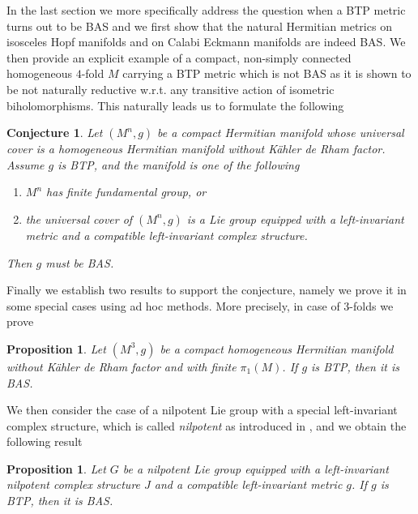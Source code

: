 \documentclass{amsart}
\numberwithin{equation}{section}
\newtheorem{proposition}[theorem]{Proposition}
\newtheorem{conjecture}  [theorem]     {Conjecture}
\theoremstyle{definition}
\renewcommand{\1}{\mathds{1}}
\renewcommand{\>}{\rightarrow}
\begin{document}
In the last section we more specifically address the question when a {\rm BTP} metric turns out to be {\rm BAS} and we first show that the natural Hermitian metrics on isosceles Hopf manifolds and on Calabi Eckmann manifolds are indeed {\rm BAS}. We then provide an explicit example of a compact, non-simply connected homogeneous $4$-fold $M$ carrying a BTP metric which is not  {\rm BAS} as it is shown to be not naturally reductive w.r.t. any transitive action of isometric biholomorphisms. This naturally leads us to formulate the following
\begin{conjecture} \label{conj1.6}
Let $(M^n,g)$ be a compact Hermitian manifold whose universal cover is a homogeneous Hermitian manifold without K\"ahler de Rham factor. Assume $g$ is {\rm BTP}, and the manifold is one of the following
\begin{enumerate}
\item $M^n$ has finite fundamental group, or
\item the universal cover of $(M^n,g)$ is a Lie group equipped with a left-invariant metric and a compatible left-invariant complex structure.
\end{enumerate}
Then $g$ must be {\rm BAS}.
\end{conjecture}
Finally we establish two results to support the conjecture, namely we prove it in some special cases using ad hoc methods. More precisely, in case of $3$-folds we prove
\begin{proposition} \label{prop5.3}
Let $(M^3,g)$ be a compact homogeneous Hermitian manifold without K\"ahler de Rham factor and with finite $\pi_1(M)$. If $g$ is {\rm BTP}, then it is {\rm BAS}.
\end{proposition}
We then consider the case of a nilpotent Lie group with a special left-invariant complex structure, which is called {\it nilpotent} as introduced in \cite{CFGU}, and we obtain the following result
\begin{proposition} \label{prop5.5}
Let $G$ be a nilpotent Lie group equipped with a left-invariant nilpotent complex structure $J$ and a compatible left-invariant metric $g$. If  $g$ is {\rm BTP}, then it is {\rm BAS}.
\end{proposition}
\end{document}
